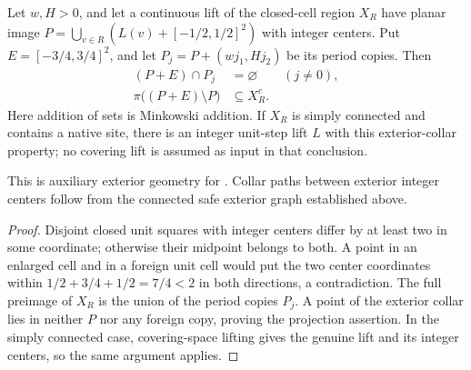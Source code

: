 \begin{lemma}%
    \label{thm:peps_torus_region_exterior_collar}
    \leanok
    Let $w,H>0$, and let a continuous lift of the
    closed-cell region $X_R$ have planar image
    $P=\bigcup_{v\in R}(L(v)+[-1/2,1/2]^2)$ with integer centers.
    Put $E=[-3/4,3/4]^2$, and let $P_j=P+(wj_1,Hj_2)$ be its period
    copies. Then
    \begin{align}
        (P+E)\cap P_j                   & =\varnothing\qquad(j\neq0), \\
        \pi\bigl((P+E)\setminus P\bigr) & \subseteq X_R^c.
    \end{align}
    Here addition of sets is Minkowski addition. If $X_R$ is simply
    connected and contains a native site, there is an integer unit-step
    lift $L$ with this exterior-collar property; no covering lift is
    assumed as input in that conclusion.

    This is auxiliary exterior geometry for
    \cite[proof of Theorem~6.9]{Schuch2010PEPS}. Collar paths between exterior integer centers follow from the
    connected safe exterior graph established above.
\end{lemma}
\begin{proof}\leanok
    Disjoint closed unit squares with integer centers differ by at
    least two in some coordinate; otherwise their midpoint belongs
    to both. A point in an enlarged cell and in a foreign unit cell
    would put the two center coordinates within
    $1/2+3/4+1/2=7/4<2$ in both directions, a contradiction.
    The full preimage of $X_R$ is the union of the period copies $P_j$.
    A point of the exterior collar lies in neither $P$ nor any foreign
    copy, proving the projection assertion. In the simply connected
    case, covering-space lifting gives the genuine lift and its
    integer centers, so the same argument applies.
\end{proof}



